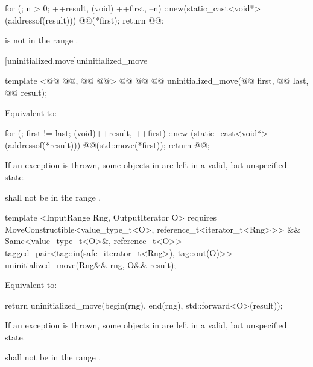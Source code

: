 \pnum
\effects {}
\begin{codeblock}
        for (; n > 0; ++result, (void) ++first, --n)
          ::new(static_cast<void*>(addressof(result)))
            @@(*first);
        return @@;
\end{codeblock}

{\color{addclr}
\pnum
\requires {} is not in the range \tcode{[first, next(first, n))}.
} %

[uninitialized.move]{uninitialized_move}
\begin{codeblock}
  template <@@ @@,
            @@ @@>
    @@
             @@
  @@
    uninitialized_move(@@ first, @@ last, @@ result);
\end{codeblock}

\setcounter{Paras}{0}
\pnum
\effects Equivalent to:
\begin{codeblock}
        for (; first != last; (void)++result, ++first)
          ::new (static_cast<void*>(addressof(*result)))
            @@(std::move(*first));
        return @@;
\end{codeblock}

\pnum
\remarks If an exception is thrown, some objects in \tcode{[first, last)} are left in a valid, but unspecified state.

{\color{addclr}
\pnum
\requires {} shall not be in the range \tcode{[first, last)}.

\begin{codeblock}
  template <InputRange Rng, OutputIterator O>
    requires MoveConstructible<value_type_t<O>, reference_t<iterator_t<Rng>>> &&
             Same<value_type_t<O>&, reference_t<O>>
  tagged_pair<tag::in(safe_iterator_t<Rng>), tag::out(O)>>
    uninitialized_move(Rng&& rng, O&& result);
\end{codeblock}

\pnum
\effects Equivalent to:
\begin{codeblock}
        return uninitialized_move(begin(rng), end(rng), std::forward<O>(result));
\end{codeblock}

\pnum
\remarks If an exception is thrown, some objects in \tcode{[first, last)} are left in a valid, but unspecified state.

\pnum
\requires {} shall not be in the range \tcode{[first, last)}.
} %

